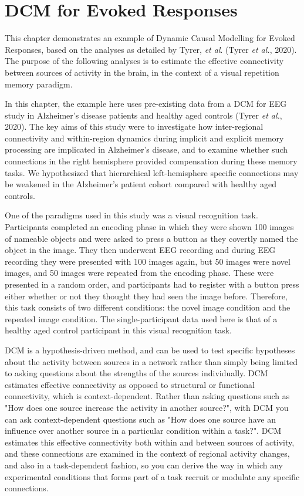 \chapter{DCM for Evoked Responses\label{Chap:DCM_ERP}}

This chapter demonstrates an example of Dynamic Causal Modelling for
Evoked Responses, based on the analyses as detailed by Tyrer, \emph{et
al}. (Tyrer \emph{et al.}, 2020). The purpose of the following analyses
is to estimate the effective connectivity between sources of activity in
the brain, in the context of a visual repetition memory paradigm.

In this chapter, the example here uses pre-existing data from a DCM for
EEG study in Alzheimer's disease patients and healthy aged controls
(Tyrer \emph{et al.}, 2020). The key aims of this study were to
investigate how inter-regional connectivity and within-region dynamics
during implicit and explicit memory processing are implicated in
Alzheimer's disease, and to examine whether such connections in the
right hemisphere provided compensation during these memory tasks. We
hypothesized that hierarchical left-hemisphere specific connections may
be weakened in the Alzheimer's patient cohort compared with healthy aged
controls.

One of the paradigms used in this study was a visual recognition task.
Participants completed an encoding phase in which they were shown 100
images of nameable objects and were asked to press a button as they
covertly named the object in the image. They then underwent EEG
recording and during EEG recording they were presented with 100 images
again, but 50 images were novel images, and 50 images were repeated from
the encoding phase. These were presented in a random order, and
participants had to register with a button press either whether or not
they thought they had seen the image before. Therefore, this task
consists of two different conditions: the novel image condition and the
repeated image condition. The single-participant data used here is that
of a healthy aged control participant in this visual recognition task.

DCM is a hypothesis-driven method, and can be used to test specific
hypotheses about the activity between sources in a network rather than
simply being limited to asking questions about the strengths of the
sources individually. DCM estimates effective connectivity as opposed to
structural or functional connectivity, which is context-dependent.
Rather than asking questions such as "How does one source increase the
activity in another source?", with DCM you can ask context-dependent
questions such as "How does one source have an influence over another
source in a particular condition within a task?". DCM estimates this
effective connectivity both within and between sources of activity, and
these connections are examined in the context of regional activity
changes, and also in a task-dependent fashion, so you can derive the way
in which any experimental conditions that forms part of a task recruit
or modulate any specific connections.

